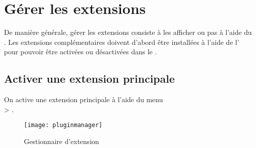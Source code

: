 \section{Gérer les extensions}\label{sec:managing_plugins}

De manière générale, gérer les extensions consiste à les afficher ou pas à l'aide 
du .
Les extensions complémentaires doivent d'abord être installées à l'aide de 
l' pour pouvoir être activées ou 
désactivées dans le .

\subsection{Activer une extension principale}\label{sec:load_core_plugin} 

On active une extension principale à l'aide du menu\\  
> .

\begin{figure}[ht]
   \begin{center}
   \texttt{[image: pluginmanager]}
   \caption{Gestionnaire d'extension \nixcaption}\label{fig:pluginmanager}
\end{center}
\end{figure}

